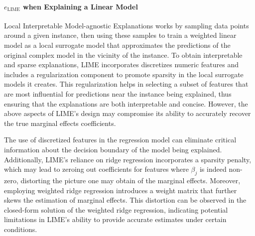\documentclass[mnsc,blindrev]{informs3}
\begin{document}
        \paragraph{$e_{\text{LIME}}$ when Explaining a Linear Model}
            \label{sec:lime_linear_case}
             Local Interpretable Model-agnostic Explanations works by sampling data points around a given instance, then using these samples to train a weighted linear model as a local surrogate model that approximates the predictions of the original complex model in the vicinity of the instance. To obtain interpretable and sparse explanations, LIME incorporates  discretizes numeric features and includes a regularization component to promote sparsity in the local surrogate models it creates. This regularization helps in selecting a subset of features that are most influential for predictions near the instance being explained, thus ensuring that the explanations are both interpretable and concise. However, the above aspects of LIME's design may compromise its ability to accurately recover the true marginal effects coefficients. 
             
             The use of discretized features in the regression model can eliminate critical information about the decision boundary of the model being explained. Additionally, LIME's reliance on ridge regression incorporates a sparsity penalty, which may lead to zeroing out coefficients for features where $\beta_j$ is indeed non-zero, distorting the picture one may obtain of the marginal effects. Moreover, employing weighted ridge regression introduces a weight matrix that further skews the estimation of marginal effects. This distortion can be observed in the closed-form solution of the weighted ridge regression, indicating potential limitations in LIME's ability to provide accurate estimates under certain conditions.
             
\end{document}
